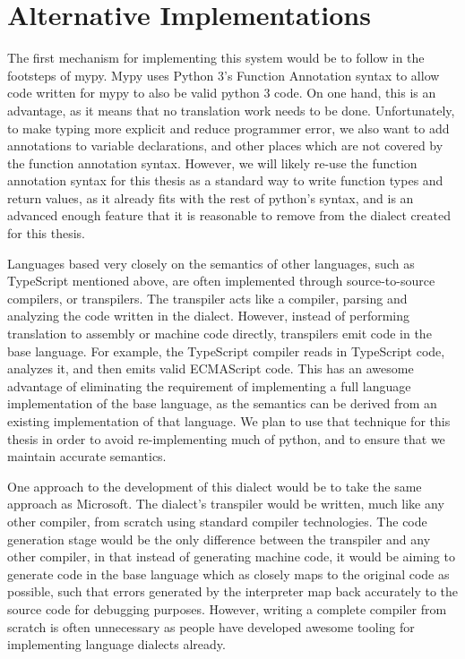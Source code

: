 \glsresetall %
\chapter{Alternative Implementations}\label{ch:AltImpls}

The first mechanism for implementing this system would be to follow in the
footsteps of mypy. Mypy uses Python 3's Function Annotation
syntax \cite{pythonfuncannot} to allow code written for mypy to also be valid
python 3 code. On one hand, this is an advantage, as it means that no
translation work needs to be done. Unfortunately, to make typing more explicit
and reduce programmer error, we also want to add annotations to variable
declarations, and other places which are not covered by the function annotation
syntax. However, we will likely re-use the function annotation syntax for this
thesis as a standard way to write function types and return values, as it
already fits with the rest of python's syntax, and is an advanced enough feature
that it is reasonable to remove from the dialect created for this thesis.

Languages based very closely on the semantics of other languages, such as
TypeScript mentioned above, are often implemented through source-to-source
compilers, or transpilers. The transpiler acts like a compiler, parsing and
analyzing the code written in the dialect. However, instead of performing
translation to assembly or machine code directly, transpilers emit code in the
base language. For example, the TypeScript compiler reads in TypeScript code,
analyzes it, and then emits valid ECMAScript code. This has an awesome advantage
of eliminating the requirement of implementing a full language implementation of
the base language, as the semantics can be derived from an existing
implementation of that language. We plan to use that technique for this thesis
in order to avoid re-implementing much of python, and to ensure that we maintain
accurate semantics.

One approach to the development of this dialect would be to take the same
approach as Microsoft. The dialect’s transpiler would be written, much like any
other compiler, from scratch using standard compiler technologies. The code
generation stage would be the only difference between the transpiler and any
other compiler, in that instead of generating machine code, it would be aiming
to generate code in the base language which as closely maps to the original code
as possible, such that errors generated by the interpreter map back accurately
to the source code for debugging purposes. However, writing a complete compiler
from scratch is often unnecessary as people have developed awesome tooling for
implementing language dialects already.

